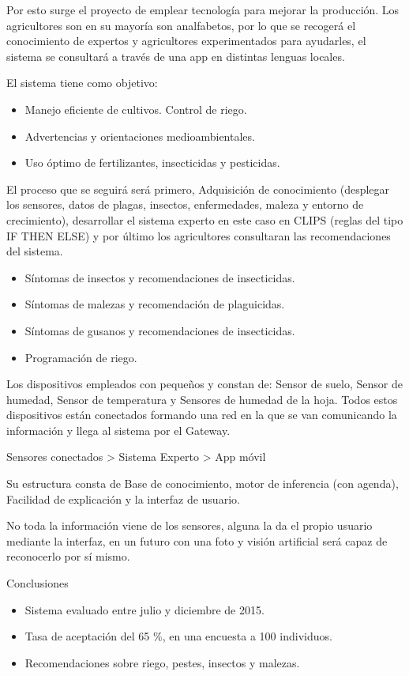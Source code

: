 \documentclass[12pt, twoside, openright]{report} %
\begin{document}
Por esto surge el proyecto de emplear tecnología para mejorar la producción. Los agricultores son en su mayoría son analfabetos, por lo que se recogerá el conocimiento de expertos y agricultores experimentados para ayudarles, el sistema se consultará a través de una app en distintas lenguas locales.

El sistema tiene como objetivo:
\begin{itemize}
	\item Manejo eficiente de cultivos. Control de riego.
	\item Advertencias y orientaciones medioambientales.
	\item Uso óptimo de fertilizantes, insecticidas y pesticidas.
\end{itemize}

El proceso que se seguirá será primero, Adquisición de conocimiento (desplegar los sensores, datos de plagas, insectos, enfermedades, maleza y entorno de crecimiento), desarrollar el sistema experto en este caso en CLIPS (reglas del tipo IF  THEN ELSE) y por último los agricultores consultaran las recomendaciones del sistema.
\begin{itemize}
	\item Síntomas de insectos y recomendaciones de insecticidas.
	\item Síntomas de malezas y recomendación de plaguicidas.
	\item Síntomas de gusanos y recomendaciones de insecticidas.
	\item Programación de riego.
\end{itemize}

Los dispositivos empleados con pequeños y constan de: Sensor de suelo, Sensor de humedad, Sensor de temperatura y Sensores de humedad de la hoja. Todos estos dispositivos están conectados formando una red en la que se van comunicando la información y llega al sistema por el Gateway.

Sensores conectados > Sistema Experto > App móvil

Su estructura consta de Base de conocimiento, motor de inferencia (con agenda), Facilidad de explicación y la interfaz de usuario.

No toda la información viene de los sensores, alguna la da el propio usuario mediante la interfaz, en un futuro con una foto y visión artificial será capaz de reconocerlo por sí mismo.
\pagebreak

Conclusiones
\begin{itemize}
	\item Sistema evaluado entre julio y diciembre de 2015.
	\item Tasa de aceptación del 65 \%, en una encuesta a 100 individuos.
	\item Recomendaciones sobre riego, pestes, insectos y malezas.
\end{itemize}
\end{document}
